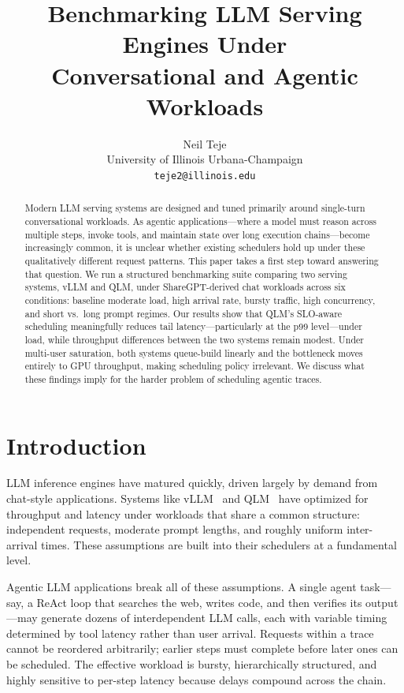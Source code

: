 \documentclass[10pt, twocolumn, letterpaper]{article}
\title{Benchmarking LLM Serving Engines Under\\Conversational and Agentic Workloads}
\author{Neil Teje \\ University of Illinois Urbana-Champaign \\ \texttt{teje2@illinois.edu}}
\begin{document}
\maketitle

\begin{abstract}
Modern LLM serving systems are designed and tuned primarily around single-turn conversational workloads. As agentic applications---where a model must reason across multiple steps, invoke tools, and maintain state over long execution chains---become increasingly common, it is unclear whether existing schedulers hold up under these qualitatively different request patterns. This paper takes a first step toward answering that question. We run a structured benchmarking suite comparing two serving systems, vLLM and QLM, under ShareGPT-derived chat workloads across six conditions: baseline moderate load, high arrival rate, bursty traffic, high concurrency, and short vs.\ long prompt regimes. Our results show that QLM's SLO-aware scheduling meaningfully reduces tail latency---particularly at the p99 level---under load, while throughput differences between the two systems remain modest. Under multi-user saturation, both systems queue-build linearly and the bottleneck moves entirely to GPU throughput, making scheduling policy irrelevant. We discuss what these findings imply for the harder problem of scheduling agentic traces.
\end{abstract}

\section{Introduction}

LLM inference engines have matured quickly, driven largely by demand from chat-style applications. Systems like vLLM~\cite{vllm} and QLM~\cite{qlm} have optimized for throughput and latency under workloads that share a common structure: independent requests, moderate prompt lengths, and roughly uniform inter-arrival times. These assumptions are built into their schedulers at a fundamental level.

Agentic LLM applications break all of these assumptions. A single agent task---say, a ReAct loop that searches the web, writes code, and then verifies its output---may generate dozens of interdependent LLM calls, each with variable timing determined by tool latency rather than user arrival. Requests within a trace cannot be reordered arbitrarily; earlier steps must complete before later ones can be scheduled. The effective workload is bursty, hierarchically structured, and highly sensitive to per-step latency because delays compound across the chain.
\end{document}
